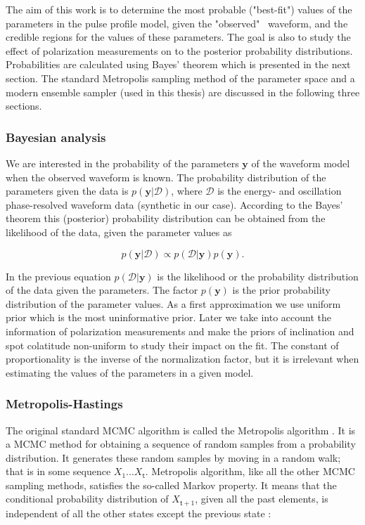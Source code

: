 \documentclass{wihuri}
\def\be{\begin{equation}}
\def\ee{\end{equation}}
\def\tstep{\mathsf{t}}
\begin{document}
The aim of this work is to determine the most probable ("best-fit") values of the parameters in the pulse profile model, given the "observed" \ 
waveform, and the credible regions for the values of these parameters. The goal is also to study the effect of polarization measurements on to the posterior probability distributions. Probabilities are calculated using Bayes' theorem which is presented in the next section. The standard Metropolis sampling method of the parameter space and a modern ensemble sampler (used in this thesis) are discussed in the following three sections. 

\subsubsection{Bayesian analysis}

We are interested in the probability of the parameters $\textbf{y}$ of the waveform model when the observed waveform is known. The probability distribution of the parameters given the data is $p(\textbf{y}|\mathcal{D})$, where $\mathcal{D}$ is the energy- and oscillation phase-resolved waveform data (synthetic in our case). According to the Bayes' theorem this (posterior) probability distribution can be obtained from the likelihood of the data, given the parameter values as \cite{nattila_bayes}


\be \label{eq:bayes}
p(\textbf{y}|\mathcal{D}) \propto p(\mathcal{D}|\textbf{y})p(\textbf{y}).
\ee

In the previous equation $p(\mathcal{D}|\textbf{y})$ is the likelihood or the probability distribution of the data given the parameters. The factor $p(\textbf{y})$ is the prior probability distribution of the parameter values. As a first approximation we use uniform prior which is the most uninformative prior. Later we take into account the information of polarization measurements and make the priors of inclination and spot colatitude non-uniform to study their impact on the fit. The constant of proportionality is the inverse of the normalization factor, but it is irrelevant when estimating the values of the parameters in a given model. 


\subsubsection{Metropolis-Hastings}

The original standard MCMC algorithm is called the Metropolis algorithm \cite{metropolis53} \cite{hastings70}. %
It is a MCMC method for obtaining a sequence of random samples from a probability distribution. It generates these random samples by moving in a random walk; that is in some sequence $X_{1}...X_{\tstep}$. Metropolis algorithm, like all the other MCMC sampling methods, satisfies the so-called Markov property. It means that the conditional probability distribution of $X_{\tstep+1}$, given all the past elements, is independent of all the other states except the previous state \cite{kaiser}:
\end{document}
